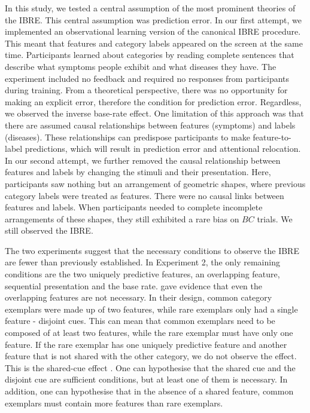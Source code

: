 \documentclass[10pt,letterpaper]{article}
\begin{document}
In this study, we tested a central assumption of the most prominent theories of the IBRE.
This central assumption was prediction error.
In our first attempt, we implemented an observational learning version of the canonical IBRE procedure.
This meant that features and category labels appeared on the screen at the same time.
Participants learned about categories by reading complete sentences that describe what symptoms people exhibit and what diseases they have.
The experiment included no feedback and required no responses from participants during training.
From a theoretical perspective, there was no opportunity for making an explicit error, therefore the condition for prediction error.
Regardless, we observed the inverse base-rate effect.
One limitation of this approach was that there are assumed causal relationships between features (symptoms) and labels (diseases).
These relationships can predispose participants to make feature-to-label predictions, which will result in prediction error and attentional relocation.
In our second attempt, we further removed the causal relationship between features and labels by changing the stimuli and their presentation.
Here, participants saw nothing but an arrangement of geometric shapes, where previous category labels were treated as features.
There were no causal links between features and labels.
When participants needed to complete incomplete arrangements of these shapes, they still exhibited a rare bias on $BC$ trials.
We still observed the IBRE.

The two experiments suggest that the necessary conditions to observe the IBRE are fewer than previously established.
In Experiment 2, the only remaining conditions are the two uniquely predictive features, an overlapping feature, sequential presentation and the base rate.
\cite{johansen2007paradoxical} gave evidence that even the overlapping features are not necessary.
In their design, common category exemplars were made up of two features, while rare exemplars only had a single feature - disjoint cues.
This can mean that common exemplars need to be composed of at least two features, while the rare exemplar must have only one feature.
If the rare exemplar has one uniquely predictive feature and another feature that is not shared with the other category, we do not observe the effect.
This is the shared-cue effect \cite{kruschke2001inverse, wills2014attention}.
One can hypothesise that the shared cue and the disjoint cue are sufficient conditions, but at least one of them is necessary.
In addition, one can hypothesise that in the absence of a shared feature, common exemplars must contain more features than rare exemplars.
\end{document}
